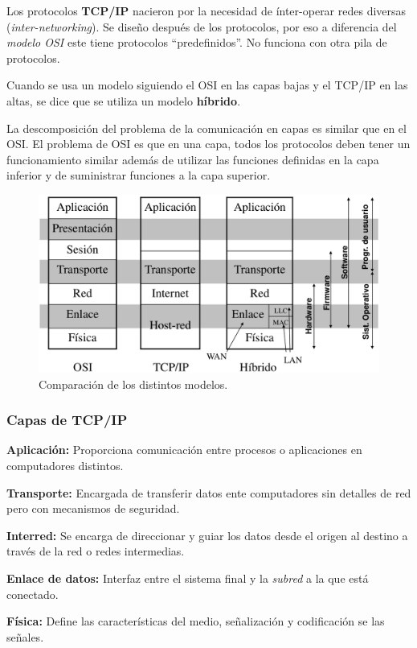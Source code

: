 \documentclass[10pt,a4paper]{article}
\begin{document}
Los protocolos \textbf{TCP/IP} nacieron por la necesidad de ínter-operar redes diversas (\textit{inter-networking}). Se diseño después de los protocolos, por eso a diferencia del \textit{modelo OSI} este tiene protocolos ``predefinidos''. No funciona con otra pila de protocolos.

Cuando se usa un modelo siguiendo el OSI en las capas bajas y el TCP/IP en las altas, se dice que se utiliza un modelo \textbf{híbrido}.

La descomposición del problema de la comunicación en capas es similar que en el OSI. El problema de OSI es que en una capa, todos los protocolos deben tener un funcionamiento similar además de utilizar las funciones definidas en la capa inferior y de suministrar funciones a la capa superior.

\begin{figure}[ht!]
  \caption{Comparación de los distintos modelos.}
  \label{fig:comparacion_modelos}  
  \centerline{\includegraphics[width=0.8\textwidth-\fboxrule-\fboxrule]{imgs/comparacion_modelos.png}}  
\end{figure}

\subsubsection{Capas de TCP/IP}
\begin{description}
\item \textbf{Aplicación:} Proporciona comunicación entre procesos o aplicaciones en computadores distintos.
\item \textbf{Transporte:} Encargada de transferir datos ente computadores sin detalles de red pero con mecanismos de seguridad.
\item \textbf{Interred:} Se encarga de direccionar y guiar los datos desde el origen al destino a través de la red o redes intermedias.
\item \textbf{Enlace de datos:} Interfaz entre el sistema final y la \textit{subred} a la que está conectado.
\item \textbf{Física:} Define las características del medio, señalización y codificación se las señales.
\end{description}
\end{document}
